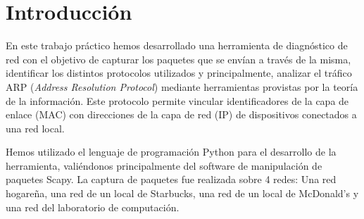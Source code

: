 \section{Introducción}

En este trabajo práctico hemos desarrollado una herramienta de diagnóstico de red con el objetivo de capturar los paquetes que se envían a través de la misma, identificar los distintos protocolos utilizados y principalmente, analizar el tráfico ARP (\textit{Address Resolution Protocol}) mediante herramientas provistas por la teoría de la información. Este protocolo permite vincular identificadores de la capa de enlace (MAC) con direcciones de la capa de red (IP) de dispositivos conectados a una red local.


Hemos utilizado el lenguaje de programación Python para el desarrollo de la herramienta, valiéndonos principalmente del software de manipulación de paquetes Scapy. La captura de paquetes fue realizada sobre 4 redes: Una red hogareña, una red de un local de Starbucks, una red de un local de McDonald's y una red del laboratorio de computación.

